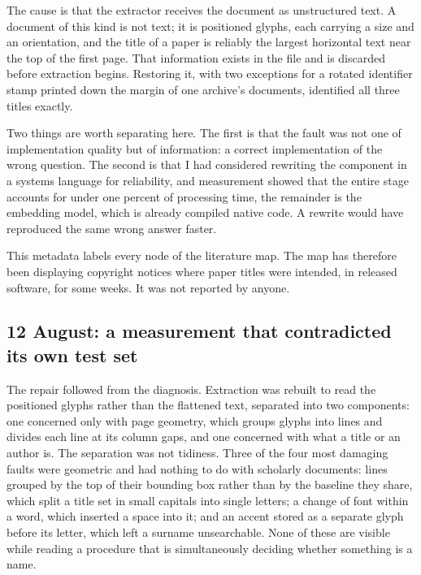 \documentclass[11pt,a4paper]{article}
\begin{document}
The cause is that the extractor receives the document as unstructured text. A
document of this kind is not text; it is positioned glyphs, each carrying a size
and an orientation, and the title of a paper is reliably the largest horizontal
text near the top of the first page. That information exists in the file and is
discarded before extraction begins. Restoring it, with two exceptions for a
rotated identifier stamp printed down the margin of one archive's documents,
identified all three titles exactly.

Two things are worth separating here. The first is that the fault was not one of
implementation quality but of information: a correct implementation of the wrong
question. The second is that I had considered rewriting the component in a
systems language for reliability, and measurement showed that the entire stage
accounts for under one percent of processing time, the remainder is the
embedding model, which is already compiled native code. A rewrite would have
reproduced the same wrong answer faster.

This metadata labels every node of the literature map. The map has therefore
been displaying copyright notices where paper titles were intended, in released
software, for some weeks. It was not reported by anyone.

\subsection{12 August: a measurement that contradicted its own test set}

The repair followed from the diagnosis. Extraction was rebuilt to read the
positioned glyphs rather than the flattened text, separated into two components:
one concerned only with page geometry, which groups glyphs into lines and divides
each line at its column gaps, and one concerned with what a title or an author
is. The separation was not tidiness. Three of the four most damaging faults were
geometric and had nothing to do with scholarly documents: lines grouped by the
top of their bounding box rather than by the baseline they share, which split a
title set in small capitals into single letters; a change of font within a word,
which inserted a space into it; and an accent stored as a separate glyph before
its letter, which left a surname unsearchable. None of these are visible while
reading a procedure that is simultaneously deciding whether something is a name.
\end{document}
